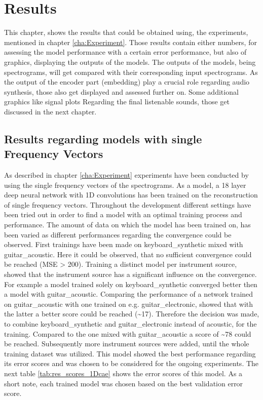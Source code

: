 \chapter[Results]{Results}
\label{cha:Results}

This chapter, shows the results that could be obtained using, the experiments, mentioned in chapter \ref{cha:Experiment}. Those results contain either numbers, for assessing the model performance with a certain error performance, but also of graphics, displaying the outputs of the models. The outputs of the models, being spectrograms, will get compared with their corresponding input spectrograms. As the output of the encoder part (embedding) play a crucial role regarding audio synthesis, those also get displayed and assessed further on. Some additional graphics like signal plots Regarding the final listenable sounds, those get discussed in the next chapter.

\section{Results regarding models with single Frequency Vectors}
As described in chapter \ref{cha:Experiment} experiments have been conducted by using the single frequency vectors of the spectrograms. As a model, a 18 layer deep neural network with 1D convolutions has been trained on the reconstruction of single frequency vectors. 
Throughout the development different settings have been tried out in order to find a model with an optimal training process and performance. The amount of data on which the model has been trained on, has been varied as different performances regarding the convergence could be observed. First trainings have been made on keyboard\_synthetic mixed with guitar\_acoustic. Here it could be observed, that no sufficient convergence could be reached (MSE > 200). Training a distinct model per instrument source, showed that the instrument source has a significant influence on the convergence. For example a model trained solely on keyboard\_synthetic converged better then a model with guitar\_acoustic. Comparing the performance of a network trained on guitar\_acoustic with one trained on e.g. guitar\_electronic, showed that with the latter a better score could be reached (\textasciitilde 17). Therefore the decision was made, to combine keyboard\_synthetic and guitar\_electronic instead of acoustic, for the training. Compared to the one mixed with guitar\_acoustic a score of \textasciitilde 78 could be reached. Subsequently more instrument sources were added, until the whole training dataset was utilized. This model showed the best performance regarding its error scores and was chosen to be considered for the ongoing experiments. The next table \ref{tab:res_scores_1Dcae} shows the error scores of this model. As a short note, each trained model was chosen based on the best validation error score. 

